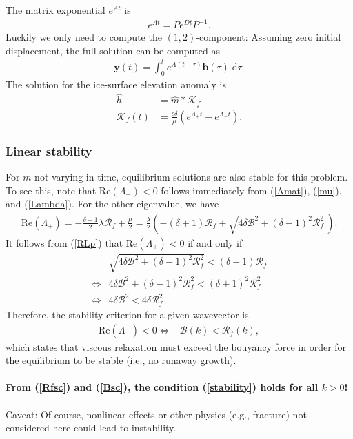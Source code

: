 \documentclass[paper=a4, fontsize=11pt]{article}
\begin{document}
The matrix exponential $e^{{A}t}$ is
\begin{align}
e^{{A}t} = {P}e^{{D}t}{P}^{-1}.
\end{align}
Luckily we only need to compute the $(1,2)$-component:
Assuming zero initial displacement, the full solution can be computed as
\begin{align}
\pmb{y}(t) = \int_0^t e^{{A}(t-\tau)} \pmb{b}(\tau)\;\mathrm{d}\tau. \label{ysol}
\end{align}
The solution for the ice-surface elevation anomaly is
\begin{align}
\widehat{h} &= \widehat{m} * \mathcal{K}_f\\
\mathcal{K}_f(t)  &=  \frac{c\delta}{\mu}(e^{\Lambda_+ t}-e^{\Lambda_-t}).
\end{align}
\subsubsection*{Linear stability}
For $m$ not varying in time, equilibrium solutions are also stable for this problem.
To see this, note that $\mathrm{Re}(\Lambda_-)<0$ follows immediately
from (\ref{Amat}), (\ref{mu}), and (\ref{Lambda}).
For the other eigenvalue, we have
\begin{align}
\mathrm{Re}(\Lambda_+) = -\frac{\delta+1}{2}\lambda\mathcal{R}_f + \frac{\mu}{2}
= \frac{\lambda}{2}\left(-(\delta+1)\mathcal{R}_f+\sqrt{4\delta\mathcal{B}^2 + (\delta-1)^2\mathcal{R}_f^2 } \,\right). \label{RLp}
\end{align}
It follows from (\ref{RLp}) that $\mathrm{Re}(\Lambda_+)<0$ if and only if
\begin{align}
&\sqrt{4\delta\mathcal{B}^2 + (\delta-1)^2\mathcal{R}_f^2 } < (\delta+1)\mathcal{R}_f \\
\iff &4\delta\mathcal{B}^2 + (\delta-1)^2\mathcal{R}_f^2 < (\delta+1)^2 \mathcal{R}_f^2 \\
\iff &4\delta\mathcal{B}^2 < 4\delta \mathcal{R}_f^2
\end{align}
Therefore, the stability criterion for a given wavevector is
\begin{align}
\mathrm{Re}(\Lambda_+)<0  \iff &\mathcal{B}(k) < \mathcal{R}_f(k), \label{stability}
\end{align}
which states that viscous relaxation must exceed the bouyancy force
in order for the equilibrium to be stable (i.e., no runaway growth). \\ \\
\textbf{From (\ref{Rfsc}) and (\ref{Bsc}),
the condition (\ref{stability}) holds for all $k>0$!}
\\ \\
Caveat: Of course, nonlinear
effects or other physics (e.g., fracture) not considered here could lead to instability.
\end{document}
